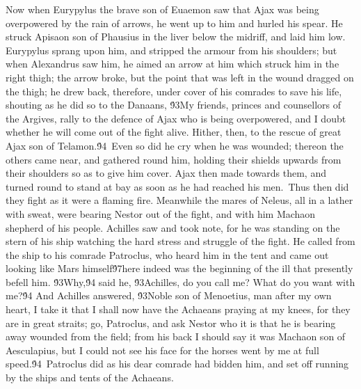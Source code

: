 {Now when Eurypylus the brave son of Euaemon saw that Ajax was being overpowered by the rain of arrows, he went up to him and hurled his spear. He struck Apisaon son of Phausius in the liver below the midriff, and laid him low. Eurypylus sprang upon him, and stripped the armour from his shoulders; but when Alexandrus saw him, he aimed an arrow at him which struck him in the right thigh; the arrow broke, but the point that was left in the wound dragged on the thigh; he drew back, therefore, under cover of his comrades to save his life, shouting as he did so to the Danaans, \'93My friends, princes and counsellors of the Argives, rally to the defence of Ajax who is being overpowered, and I doubt whether he will come out of the fight alive. Hither, then, to the rescue of great Ajax son of Telamon.\'94\
Even so did he cry when he was wounded; thereon the others came near, and gathered round him, holding their shields upwards from their shoulders so as to give him cover. Ajax then made towards them, and turned round to stand at bay as soon as he had reached his men.\
Thus then did they fight as it were a flaming fire. Meanwhile the mares of Neleus, all in a lather with sweat, were bearing Nestor out of the fight, and with him Machaon shepherd of his people. Achilles saw and took note, for he was standing on the stern of his ship watching the hard stress and struggle of the fight. He called from the ship to his comrade Patroclus, who heard him in the tent and came out looking like Mars himself\'97here indeed was the beginning of the ill that presently befell him. \'93Why,\'94 said he, \'93Achilles, do you call me? What do you want with me?\'94 And Achilles answered, \'93Noble son of Menoetius, man after my own heart, I take it that I shall now have the Achaeans praying at my knees, for they are in great straits; go, Patroclus, and ask Nestor who it is that he is bearing away wounded from the field; from his back I should say it was Machaon son of Aesculapius, but I could not see his face for the horses went by me at full speed.\'94\
Patroclus did as his dear comrade had bidden him, and set off running by the ships and tents of the Achaeans.\
}
